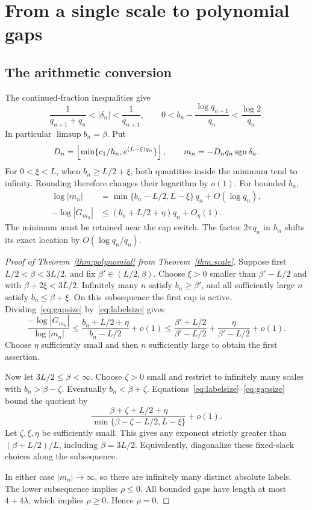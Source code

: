 \section{From a single scale to polynomial gaps}\label{sec:consequences}
\subsection{The arithmetic conversion}
The continued-fraction inequalities give
\begin{equation}\label{eq:CF}
 \frac1{q_{n+1}+q_n}<|\delta_n|<\frac1{q_{n+1}},\qquad
 0<b_n-\frac{\log q_{n+1}}{q_n}<\frac{\log2}{q_n}.
\end{equation}
In particular $\limsup b_n=\beta$. Put
\[
 D_n=\left\lfloor\min\{c_1/\hbar_n,
                        e^{(L-\xi)q_n}\}\right\rfloor,
 \qquad m_n=-D_nq_n\operatorname{sgn}\delta_n.
\]
For $0<\xi<L$, when $b_n\ge L/2+\xi$, both quantities inside the minimum tend to infinity. Rounding therefore changes their logarithm by $o(1)$. For bounded $b_n$,
\begin{align}
 \log|m_n|&=\min\{b_n-L/2,L-\xi\}\,q_n+O(\log q_n),\label{eq:labelsize}\\
 -\log|G_{m_n}|&\le(b_n+L/2+\eta)q_n+O_\eta(1).
 \label{eq:gapsize}
\end{align}
The minimum must be retained near the cap switch. The factor $2\pi q_n$ in $\hbar_n$ shifts its exact location by $O(\log q_n/q_n)$.

\begin{proof}[Proof of Theorem~\ref{thm:polynomial} from Theorem~\ref{thm:scale}]
Suppose first $L/2<\beta<3L/2$, and fix $\beta'\in(L/2,\beta)$. Choose $\xi>0$ smaller than $\beta'-L/2$ and with $\beta+2\xi<3L/2$. Infinitely many $n$ satisfy $b_n\ge\beta'$, and all sufficiently large $n$ satisfy $b_n\le\beta+\xi$. On this subsequence the first cap is active. Dividing~\eqref{eq:gapsize} by~\eqref{eq:labelsize} gives
\[
 \frac{-\log|G_{m_n}|}{\log|m_n|}
 \le\frac{b_n+L/2+\eta}{b_n-L/2}+o(1)
 \le\frac{\beta'+L/2}{\beta'-L/2}
       +\frac{\eta}{\beta'-L/2}+o(1).
\]
Choose $\eta$ sufficiently small and then $n$ sufficiently large to obtain the first assertion.

Now let $3L/2\le\beta<\infty$. Choose $\zeta>0$ small and restrict to infinitely many scales with $b_n>\beta-\zeta$. Eventually $b_n<\beta+\zeta$. Equations~\eqref{eq:labelsize}--\eqref{eq:gapsize} bound the quotient by
\[
 \frac{\beta+\zeta+L/2+\eta}
 {\min\{\beta-\zeta-L/2,L-\xi\}}+o(1).
\]
Let $\zeta,\xi,\eta$ be sufficiently small. This gives any exponent strictly greater than $(\beta+L/2)/L$, including $\beta=3L/2$. Equivalently, diagonalize these fixed-slack choices along the subsequence.

In either case $|m_n|\to\infty$, so there are infinitely many distinct absolute labels. The lower subsequence implies $\rho\le0$. All bounded gaps have length at most $4+4\lambda$, which implies $\rho\ge0$. Hence $\rho=0$.
\end{proof}

